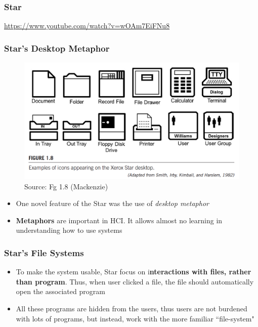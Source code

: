 \documentclass{beamer}
\begin{document}
\begin{frame}
\frametitle{Star}
\url{https://www.youtube.com/watch?v=wOAm7EiFNu8}
\end{frame}



\begin{frame}
\frametitle{Star's Desktop Metaphor}
\begin{figure}
	\includegraphics[width=0.5\linewidth]{metaphors}
	\caption{Source: Fg 1.8 (Mackenzie)}
\end{figure}
\begin{itemize}
	\item One novel feature of the Star was the use of \textit{desktop metaphor}
	\item \textbf{Metaphors} are important in HCI.  It allows almost no learning in understanding how to use systems
\end{itemize}
\end{frame}

\begin{frame}
\frametitle{Star's File Systems}
\begin{itemize}
	\item To make the system usable, Star focus on i\textbf{nteractions with files, rather than program}.  Thus, when user clicked a file, the file should automatically open the associated program
	\item All these programs are hidden from the users, thus users are not burdened with lots of programs, but instead, work with the more familiar ``file-system"
\end{itemize}
\end{frame}
\end{document}
